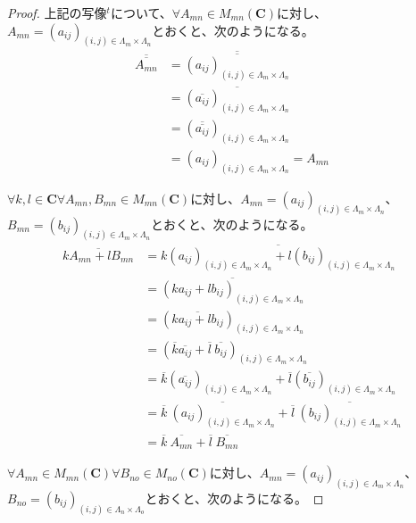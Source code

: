 \documentclass[dvipdfmx]{jsarticle}
\begin{document}
\begin{proof}
上記の写像${}^{t}$について、$\forall A_{mn} \in M_{mn}\left( \mathbf{C} \right)$に対し、$A_{mn} = \left( a_{ij} \right)_{(i,j) \in \varLambda_{m} \times \varLambda_{n}}$とおくと、次のようになる。
\begin{align*}
\overline{\overline{A_{mn}}} &= \overline{\overline{\left( a_{ij} \right)_{(i,j) \in \varLambda_{m} \times \varLambda_{n}}}}\\
&= \overline{\left( \overline{a_{ij}} \right)_{(i,j) \in \varLambda_{m} \times \varLambda_{n}}}\\
&= \left( \overline{\overline{a_{ij}}} \right)_{(i,j) \in \varLambda_{m} \times \varLambda_{n}}\\
&= \left( a_{ij} \right)_{(i,j) \in \varLambda_{m} \times \varLambda_{n}} = A_{mn}
\end{align*}\par
$\forall k,l \in \mathbf{C}\forall A_{mn},B_{mn} \in M_{mn}\left( \mathbf{C} \right)$に対し、$A_{mn} = \left( a_{ij} \right)_{(i,j) \in \varLambda_{m} \times \varLambda_{n}}$、$B_{mn} = \left( b_{ij} \right)_{(i,j) \in \varLambda_{m} \times \varLambda_{n}}$とおくと、次のようになる。
\begin{align*}
\overline{kA_{mn} + lB_{mn}} &= \overline{k\left( a_{ij} \right)_{(i,j) \in \varLambda_{m} \times \varLambda_{n}} + l\left( b_{ij} \right)_{(i,j) \in \varLambda_{m} \times \varLambda_{n}}}\\
&= \overline{\left( ka_{ij} + lb_{ij} \right)_{(i,j) \in \varLambda_{m} \times \varLambda_{n}}}\\
&= \left( \overline{ka_{ij} + lb_{ij}} \right)_{(i,j) \in \varLambda_{m} \times \varLambda_{n}}\\
&= \left( \overline{k}\overline{a_{ij}} + \overline{l}\ \overline{b_{ij}} \right)_{(i,j) \in \varLambda_{m} \times \varLambda_{n}}\\
&= \overline{k}\left( \overline{a_{ij}} \right)_{(i,j) \in \varLambda_{m} \times \varLambda_{n}} + \overline{l}\left( \overline{b_{ij}} \right)_{(i,j) \in \varLambda_{m} \times \varLambda_{n}}\\
&= \overline{k}\ \overline{\left( a_{ij} \right)_{(i,j) \in \varLambda_{m} \times \varLambda_{n}}} + \overline{l}\ \overline{\left( b_{ij} \right)_{(i,j) \in \varLambda_{m} \times \varLambda_{n}}}\\
&= \overline{k}\ \overline{A_{mn}} + \overline{l}\ \overline{B_{mn}}
\end{align*}\par
$\forall A_{mn} \in M_{mn}\left( \mathbf{C} \right)\forall B_{no} \in M_{no}\left( \mathbf{C} \right)$に対し、$A_{mn} = \left( a_{ij} \right)_{(i,j) \in \varLambda_{m} \times \varLambda_{n}}$、$B_{no} = \left( b_{ij} \right)_{(i,j) \in \varLambda_{n} \times \varLambda_{o}}$とおくと、次のようになる。

\end{proof}
\end{document}
